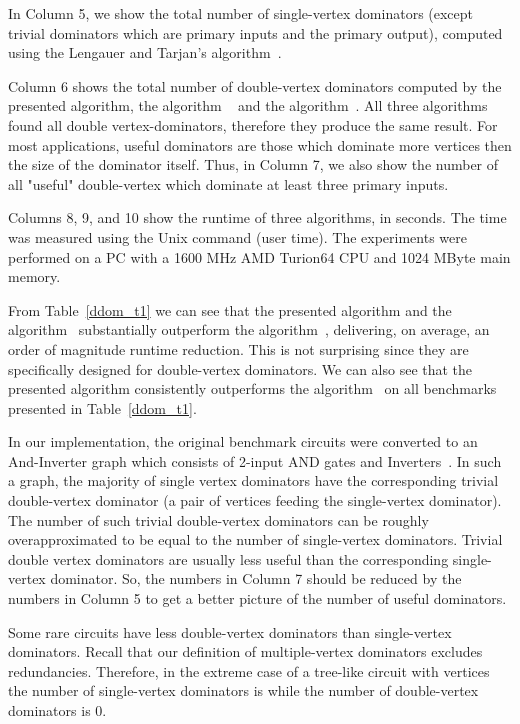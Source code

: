\documentclass{llncs}
\begin{document}
In Column 5, we show the total number of single-vertex dominators
(except trivial dominators which are primary inputs and the primary output),
computed using the Lengauer and Tarjan's algorithm~\cite{LeT79}.

Column 6 shows the total number of double-vertex dominators computed by
 the presented algorithm, the algorithm ~\cite{TeD05b} and the algorithm~\cite{DuTM04}.  
All three algorithms found all double
vertex-dominators, therefore they produce the same result.
For most applications, useful dominators are
those which dominate more vertices then the size of the dominator
itself. Thus, in Column 7, we also show the number of all "useful"
double-vertex which dominate at least three primary inputs.

Columns 8, 9, and 10 show the runtime of three algorithms, in seconds. The
time was measured using the Unix command  (user time). The
experiments were performed on a PC with a 1600 MHz AMD Turion64 CPU
and 1024 MByte main memory.

From Table~\ref{ddom_t1} we can see that the presented algorithm and
the algorithm~\cite{TeD05b} substantially outperform the algorithm~\cite{DuTM04}, delivering, on
average, an order of magnitude runtime reduction. This is not surprising since
they are specifically designed for double-vertex dominators.
We can also see that the presented algorithm consistently outperforms
the algorithm~\cite{TeD05b} on all 
benchmarks presented in Table~\ref{ddom_t1}.

In our implementation, the original benchmark circuits were converted to
an And-Inverter graph which consists of 2-input AND gates 
and Inverters~\cite{kuehlmann}. In such a graph, the majority of single vertex dominators have
the corresponding trivial double-vertex dominator (a pair of
vertices feeding the single-vertex dominator). The number of such
trivial double-vertex dominators can be roughly overapproximated to be
equal to the number of single-vertex dominators. Trivial double vertex
dominators  are usually less useful than the corresponding
single-vertex dominator. So, the numbers in Column 7 should be reduced by
the numbers in Column 5 to get a better picture of the number
of useful dominators.

Some rare circuits have less double-vertex dominators than
single-vertex dominators. Recall that our definition of multiple-vertex dominators
excludes redundancies. Therefore, in the extreme case of a tree-like
circuit with  vertices the number of single-vertex dominators is  while the number of double-vertex dominators is 0.
\end{document}

